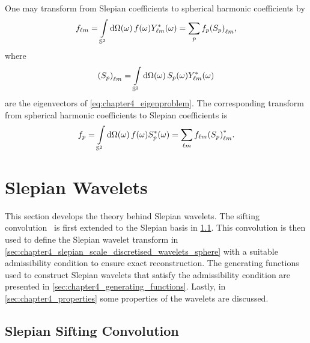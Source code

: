 One may transform from Slepian coefficients to spherical harmonic coefficients by
%
\begin{equation}
	{f}_{\ell m}
	= \int\limits_{\mathbb{S}^{2}} \dd{\Omega(\omega)} f(\omega) {Y}_{\ell m}^{\ast}(\omega)
	= \sum\limits_{p} {f}_{p}{({S}_{p})}_{\ell m},
\end{equation}
%
where
%
\begin{equation}\label{eq:chapter4_harmonic_slepian}
	{({S}_{p})}_{\ell m}
	= \int\limits_{\mathbb{S}^{2}} \dd{\Omega(\omega)} {S}_{p}(\omega) {Y}_{\ell m}^{\ast}(\omega)
\end{equation}
%
are the eigenvectors of \cref{eq:chapter4_eigenproblem}.
The corresponding transform from spherical harmonic coefficients to Slepian coefficients is
%
\begin{equation}\label{eq:chapter4_harmonic_to_slepian}
	{f}_{p}
	= \int\limits_{\mathbb{S}^{2}} \dd{\Omega(\omega)} f(\omega) {S}_{p}^{\ast}(\omega)
	= \sum\limits_{\ell m} {f}_{\ell m} {({S}_{p})}_{\ell m}^{\ast}.
\end{equation}

\section{Slepian Wavelets}\label{sec:chapter4_slepian_wavelets}

This section develops the theory behind Slepian wavelets.
The sifting convolution~\autocite{Roddy2021} is first extended to the Slepian basis in \cref{sec:chapter4_slepian_sifting_convolution}.
This convolution is then used to define the Slepian wavelet transform in \cref{sec:chapter4_slepian_scale_discretised_wavelets_sphere} with a suitable admissibility condition to ensure exact reconstruction.
The generating functions used to construct Slepian wavelets that satisfy the admissibility condition are presented in \cref{sec:chapter4_generating_functions}.
Lastly, in \cref{sec:chapter4_properties} some properties of the wavelets are discussed.

\subsection{Slepian Sifting Convolution}\label{sec:chapter4_slepian_sifting_convolution}

